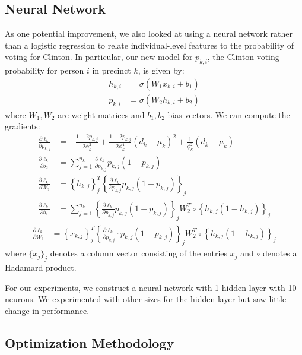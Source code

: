 \documentclass[10pt, letterpaper]{article}
\begin{document}
\begin{multicols}{2}
\subsection{Neural Network} 
As one potential improvement, we also looked at using a neural network rather than a logistic regression to relate individual-level features to the probability of voting for Clinton. In particular, our new model for $p_{k, i}$, the Clinton-voting probability for person $i$ in precinct $k$, is given by: 
\begin{align*}
h_{k, i} &= \sigma\left(W_1 x_{k, i} + b_1 \right) \\
p_{k, i} &= \sigma\left(W_2 h_{k, i} + b_2 \right) 
\end{align*}
where $W_1, W_2$ are weight matrices and $b_1, b_2$ bias vectors. We can compute the gradients: 
\begin{align*}
\frac{\partial \ell_k}{\partial p_{k, j}} &= - \frac{1 - 2p_{k, j}}{2 \phi_k^2} + \frac{1 - 2p_{k, j}}{2 \phi_k^4} (d_k - \mu_k)^2  + \frac{1}{\phi_k^2} \left(d_k - \mu_k \right) \\
\frac{\partial \ell_k}{\partial b_2} &= \sum_{j = 1}^{n_k} \frac{\partial \ell_k}{\partial p_{k, j}} p_{k, j} (1 - p_{k, j}) \\
\frac{\partial \ell_k}{\partial W_2} &= \left\{ h_{k, j} \right\}_j^T \left\{ \frac{\partial \ell_k}{\partial p_{k, j}} p_{k, j} (1 - p_{k, j})\right\}_{j} \\
\frac{\partial \ell_k}{\partial b_1} &= \sum_{j = 1}^{n_k} \left\{ \frac{\partial \ell_k}{\partial p_{k, j}} p_{k, j} (1 - p_{k, j})\right\}_{j} W_2^T \circ \left\{ h_{k, j}(1 - h_{k, j})\right\}_j 
\end{align*}
\begin{align*}
\frac{\partial\ell_k}{\partial W_1} &= \left\{ x_{k, j} \right\}_j^T \left\{ \frac{\partial \ell_k}{\partial p_{k, j}} \cdot p_{k, j} (1 - p_{k, j})\right\}_{j} W_2^T \circ \left\{ h_{k, j}(1 - h_{k, j})\right\}_j
\end{align*}
where $\{x_j\}_j$ denotes a column vector consisting of the entries $x_j$ and $\circ$ denotes a Hadamard product.

For our experiments, we construct a neural network with 1 hidden layer with 10 neurons. We experimented with other sizes for the hidden layer but saw little change in performance.

\subsection{Optimization Methodology}


\end{multicols}
\end{document}
